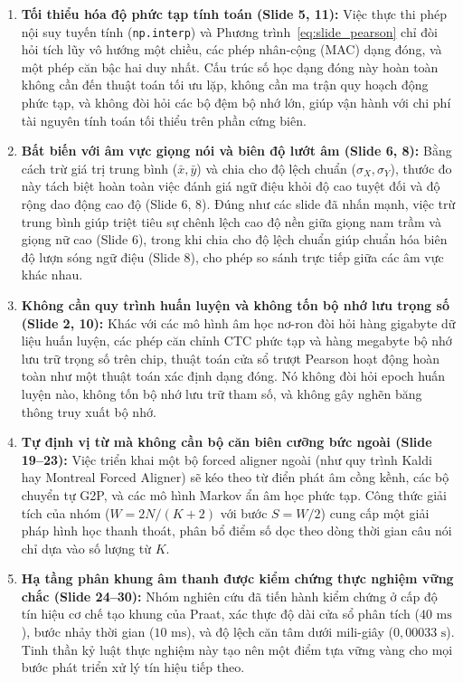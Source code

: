 \documentclass[11pt,a4paper]{article}
\begin{document}
\begin{enumerate}
    \item \textbf{Tối thiểu hóa độ phức tạp tính toán (Slide 5, 11):} Việc thực thi phép nội suy tuyến tính (\texttt{np.interp}) và Phương trình~\eqref{eq:slide_pearson} chỉ đòi hỏi tích lũy vô hướng một chiều, các phép nhân-cộng (MAC) dạng đóng, và một phép căn bậc hai duy nhất. Cấu trúc số học dạng đóng này hoàn toàn không cần đến thuật toán tối ưu lặp, không cần ma trận quy hoạch động phức tạp, và không đòi hỏi các bộ đệm bộ nhớ lớn, giúp vận hành với chi phí tài nguyên tính toán tối thiểu trên phần cứng biên.
    \item \textbf{Bất biến với âm vực giọng nói và biên độ lướt âm (Slide 6, 8):} Bằng cách trừ giá trị trung bình ($\bar{x}, \bar{y}$) và chia cho độ lệch chuẩn ($\sigma_X, \sigma_Y$), thước đo này tách biệt hoàn toàn việc đánh giá ngữ điệu khỏi độ cao tuyệt đối và độ rộng dao động cao độ (Slide 6, 8). Đúng như các slide đã nhấn mạnh, việc trừ trung bình giúp triệt tiêu sự chênh lệch cao độ nền giữa giọng nam trầm và giọng nữ cao (Slide 6), trong khi chia cho độ lệch chuẩn giúp chuẩn hóa biên độ lượn sóng ngữ điệu (Slide 8), cho phép so sánh trực tiếp giữa các âm vực khác nhau.
    \item \textbf{Không cần quy trình huấn luyện và không tốn bộ nhớ lưu trọng số (Slide 2, 10):} Khác với các mô hình âm học nơ-ron đòi hỏi hàng gigabyte dữ liệu huấn luyện, các phép căn chỉnh CTC phức tạp và hàng megabyte bộ nhớ lưu trữ trọng số trên chip, thuật toán cửa sổ trượt Pearson hoạt động hoàn toàn như một thuật toán xác định dạng đóng. Nó không đòi hỏi epoch huấn luyện nào, không tốn bộ nhớ lưu trữ tham số, và không gây nghẽn băng thông truy xuất bộ nhớ.
    \item \textbf{Tự định vị từ mà không cần bộ căn biên cưỡng bức ngoài (Slide 19--23):} Việc triển khai một bộ forced aligner ngoài (như quy trình Kaldi hay Montreal Forced Aligner) sẽ kéo theo từ điển phát âm cồng kềnh, các bộ chuyển tự G2P, và các mô hình Markov ẩn âm học phức tạp. Công thức giải tích của nhóm ($W = 2N/(K+2)$ với bước $S = W/2$) cung cấp một giải pháp hình học thanh thoát, phân bổ điểm số dọc theo dòng thời gian câu nói chỉ dựa vào số lượng từ $K$.
    \item \textbf{Hạ tầng phân khung âm thanh được kiểm chứng thực nghiệm vững chắc (Slide 24--30):} Nhóm nghiên cứu đã tiến hành kiểm chứng ở cấp độ tín hiệu cơ chế tạo khung của Praat, xác thực độ dài cửa sổ phân tích ($40\text{ ms}$), bước nhảy thời gian ($10\text{ ms}$), và độ lệch căn tâm dưới mili-giây ($0{,}00033\text{ s}$). Tinh thần kỷ luật thực nghiệm này tạo nên một điểm tựa vững vàng cho mọi bước phát triển xử lý tín hiệu tiếp theo.
\end{enumerate}
\end{document}
